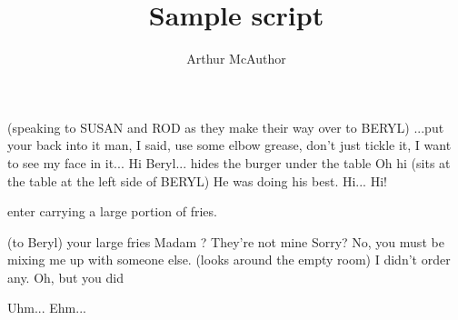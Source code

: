 \documentclass[]{theatre}
\title{Sample script}
\author{Arthur McAuthor}
\begin{document}
\maketitle
\castlist

\act
\scene



\lynda (speaking to SUSAN and ROD as they make their way over to BERYL) ...put your back into it man, I said, use some elbow grease, don’t just tickle it, I want to see my face in it... Hi Beryl...
\beryldo hides the burger under the table
\beryl Oh hi
\sue (sits at the table at the left side of BERYL) He was doing his best.
\rod Hi...
\lynda Hi!


\waiteronetwodo enter carrying a large portion of fries.

\waiterone (to Beryl) your large fries Madam
\lyndaberyl ?
\beryl They're not mine
\waiteronetwo Sorry?
\beryl No, you must be mixing me up with someone else.
\waitertwo (looks around the empty room)
\beryl I didn't order any.
\waiterone Oh, but you did

\scene

\beryl Uhm...
\rod Ehm...
\end{document}
